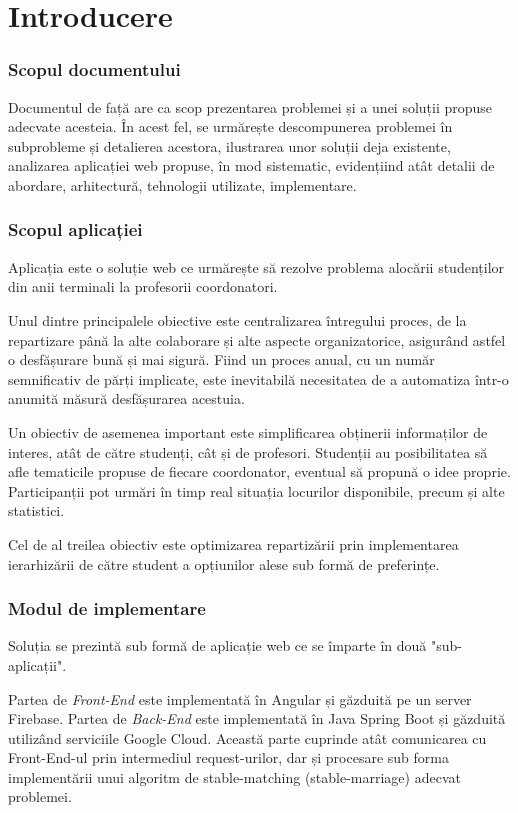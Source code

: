 \chapter*{Introducere} 

\subsection{Scopul documentului}
Documentul de față are ca scop prezentarea problemei și a unei soluții propuse adecvate acesteia. În acest fel, se urmărește descompunerea problemei în subprobleme și detalierea acestora, ilustrarea unor soluții deja existente, analizarea aplicației web propuse, în mod sistematic, evidențiind atât detalii de abordare, arhitectură, tehnologii utilizate, implementare.

\subsection{Scopul aplicației}
Aplicația \textit{\thesistitle{}} este o soluție web ce urmărește să rezolve problema alocării studenților din anii terminali la profesorii coordonatori.

Unul dintre principalele obiective este centralizarea întregului proces, de la repartizare până la alte colaborare și alte aspecte organizatorice, asigurând astfel o desfășurare bună și mai sigură. Fiind un proces anual, cu un număr semnificativ de părți implicate, este inevitabilă necesitatea de a automatiza într-o anumită măsură desfășurarea acestuia.

Un obiectiv de asemenea important este simplificarea obținerii informaților de interes, atât de către studenți, cât și de profesori. Studenții au posibilitatea să afle tematicile propuse de fiecare coordonator, eventual să propună o idee proprie. Participanții pot urmări în timp real situația locurilor disponibile, precum și alte statistici.

Cel de al treilea obiectiv este optimizarea repartizării prin implementarea ierarhizării de către student a opțiunilor alese sub formă de preferințe.

\subsection{Modul de implementare}
Soluția se prezintă sub formă de aplicație web ce se împarte în două "sub-aplicații".

Partea de \textit{Front-End} este implementată în Angular și găzduită pe un server Firebase.
Partea de \textit{Back-End} este implementată în Java Spring Boot și găzduită utilizând serviciile Google Cloud. Această parte cuprinde atât comunicarea cu Front-End-ul prin intermediul request-urilor, dar și procesare sub forma implementării unui algoritm de stable-matching (stable-marriage) adecvat problemei.